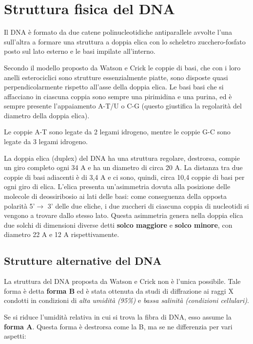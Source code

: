 \documentclass[11pt]{book}
\begin{document}
\section{Struttura fisica del DNA}\label{struttura-fisica-del-dna}

Il DNA è formato da due catene polinucleotidiche antiparallele avvolte
l'una sull'altra a formare una struttura a doppia elica con lo scheletro
zucchero-fosfato posto sul lato esterno e le basi impilate all'interno.

Secondo il modello proposto da Watson e Crick le coppie di basi, che con
i loro anelli esterociclici sono strutture essenzialmente piatte, sono
disposte quasi perpendicolarmente rispetto all'asse della doppia elica.
Le basi basi che si affacciano in ciascuna coppia sono sempre una
pirimidina e una purina, ed è sempre presente l'appaiamento A-T/U o C-G
(questo giustifica la regolarità del diametro della doppia elica).

Le coppie A-T sono legate da 2 legami idrogeno, mentre le coppie G-C
sono legate da 3 legami idrogeno.

La doppia elica (duplex) del DNA ha una struttura regolare, destrorsa,
compie un giro completo ogni 34 A e ha un diametro di circa 20 A. La
distanza tra due coppie di basi adiacenti è di 3,4 A e ci sono, quindi,
circa 10,4 coppie di basi per ogni giro di elica. L'elica presenta
un'asimmetria dovuta alla posizione delle molecole di deossiribosio ai
lati delle basi: come conseguenza della opposta polarità
5'\(\rightarrow\) 3' delle due eliche, i due zuccheri di ciascuna coppia
di nucleotidi si vengono a trovare dallo stesso lato. Questa asimmetria
genera nella doppia elica due solchi di dimensioni diverse detti
\textbf{solco maggiore} e \textbf{solco minore}, con diametro 22 A e 12
A rispettivamente.

\subsection{Strutture alternative del
DNA}\label{strutture-alternative-del-dna}

La struttura del DNA proposta da Watson e Crick non è l'unica possibile.
Tale forma è detta \textbf{forma B} ed è stata ottenuta da studi di
diffrazione ai raggi X condotti in condizioni di \emph{alta umidità
(95\%)} e \emph{bassa salinità (condizioni cellulari)}.

Se si riduce l'umidità relativa in cui si trova la fibra di DNA, esso
assume la \textbf{forma A}. Questa forma è destrorsa come la B, ma se ne
differenzia per vari aspetti:
\end{document}
